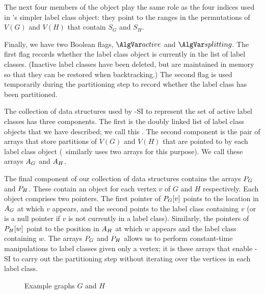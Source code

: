 The next four members of the object play the same role as the four indices used in \McSplit's
simpler label class object: they point to the ranges in the permutations of $V(G)$ and $V(H)$ that
contain $S_G$ and $S_H$.

Finally, we have two Boolean flags, $\varActive$ and $\varSplitting$.  The first flag
records whether the label class object is currently in the list of label classes.  (Inactive
label classes have been deleted, but are maintained in memory so that they can be restored
when backtracking.)  The second flag is used temporarily during the partitioning step
to record whether the label class has been partitioned.

The collection of data structures used by \McSplit-SI to represent the set of
active label classes has three components.  The first is the doubly linked
list of label class objects that we have described; we call this \calLC.  The
second component is the pair of arrays that store partitions of $V(G)$ and
$V(H)$ that are pointed to by each label class object (\McSplit\ similarly uses
two arrays for this purpose).   We call these arrays $A_G$ and $A_H$.

The final component of our collection of data structures contains the arrays $P_G$
and $P_H$.  These contain
an object for each vertex $v$ of $G$ and $H$ respectively.  Each object comprises two pointers.
The first pointer of $P_G[v]$ points to the location in $A_G$ at which $v$
appears, and the second points to the label class containing $v$ (or is a null pointer
if $v$ is not currently in a label class).
Similarly, the pointers of $P_H[w]$ point to the position in $A_H$ at which $w$
appears and the label class containing $w$.
The arrays $P_G$ and $P_H$ allows us to perform constant-time
manipulations to label classes given only a vertex; it is these arrays that enable
\McSplit-SI to carry out the partitioning step without iterating over the vertices in each label class.

\begin{figure}[htb]
    \centering
    \caption{Example graphs $G$ and $H$}
    \label{figure:example-g-and-h-redux}
\end{figure}

